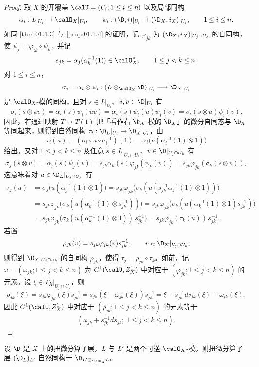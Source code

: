 \begin{proof}
取 $X$ 的开覆盖 $\calU=(U_i;1\le i\le n)$ 以及局部同构
$$\alpha_i:L|_{U_i}\to\calO_X|_{U_i},\qquad \psi_i:(\D,i)|_{U_i}\to(\D_X,i_X)|_{U_i},\qquad 1\le i\le n.$$
如同 \ref{thm:01.1.3} 与 \ref{prop:01.1.4} 的证明，记 $\varphi_{jk}$ 为 $(\D_X,i_X)|_{U_j\cap U_k}$ 的自同构，使 $\psi_j=\varphi_{jk}\circ\psi_k$，并记
$$s_{jk}=\alpha_j(\alpha_k^{-1}(1))\in\calO_X^*,\qquad 1\le j<k\le n.$$
对 $1\le i\le n$，
$$\sigma_i=\alpha_i\otimes\psi_i:(L\otimes_{\calO_X}\D)|_{U_i}\longrightarrow\D_X|_{U_i}$$
是 $\calO_X$-模的同构，且对 $s\in L|_{U_i}$、$u,v\in\D|_{U_i}$ 有
$$\sigma_i(s\otimes uv)=\alpha_i(s)\psi_i(uv)=\alpha_i(s)\psi_i(u)\psi_i(v)=\sigma_i(s\otimes u)\psi_i(v).$$
因此，若通过映射 $T\mapsto T(1)$ 把「看作右 $\D_X$-模的 $\D_X$」的微分自同态与 $\D_X$ 等同起来，则得到自然同构 $\tau_i:\D_L|_{U_i}\to\D_X|_{U_i}$，由
$$\tau_i(u)=(\sigma_i\circ u\circ\sigma_i^{-1})(1)=\sigma_i\bigl(u(\alpha_i^{-1}(1)\otimes 1)\bigr)$$
给出。又对 $1\le j<k\le n$ 及任意 $s\in L|_{U_j\cap U_k}$、$v\in\D|_{U_j\cap U_k}$ 有
$$\sigma_j(s\otimes v)=\alpha_j(s)\psi_j(v)=s_{jk}\alpha_k(s)\varphi_{jk}(\psi_k(v))=s_{jk}\varphi_{jk}(\sigma_k(s\otimes v)),$$
这意味着对 $u\in\D_L|_{U_j\cap U_k}$ 有
\begin{align*}
\tau_j(u)&=\sigma_j\bigl(u(\alpha_j^{-1}(1)\otimes 1)\bigr)=s_{jk}\varphi_{jk}\bigl(\sigma_k(u(s_{jk}^{-1}\alpha_k^{-1}(1)\otimes 1))\bigr)\\
&=s_{jk}\varphi_{jk}\bigl(\sigma_k(u(\alpha_k^{-1}(1)\otimes s_{jk}^{-1}))\bigr)=s_{jk}\varphi_{jk}\bigl(\sigma_k(u(\alpha_k^{-1}(1)\otimes 1)s_{jk}^{-1})\bigr)\\
&=s_{jk}\varphi_{jk}\bigl(\sigma_k(u(\alpha_k^{-1}(1)\otimes 1))\,s_{jk}^{-1}\bigr)=s_{jk}\varphi_{jk}(\tau_k(u))\,s_{jk}^{-1}.
\end{align*}
若置
$$\rho_{jk}(v)=s_{jk}\varphi_{jk}(v)s_{jk}^{-1},\qquad v\in\D_X|_{U_j\cap U_k},$$
则得到 $\D_X|_{U_j\cap U_k}$ 的自同构 $\rho_{jk}$，使得 $\tau_j=\rho_{jk}\circ\tau_k$。如前，记 $\omega=(\omega_{jk};1\le j<k\le n)$ 为 $C^1(\calU,Z^1_X)$ 中对应于 $(\varphi_{jk};1\le j<k\le n)$ 的元素。设 $\xi\in T_X|_{U_j\cap U_k}$，则
$$\rho_{jk}(\xi)=s_{jk}\varphi_{jk}(\xi)s_{jk}^{-1}=s_{jk}(\xi-\omega_{jk}(\xi))s_{jk}^{-1}=\xi-s_{jk}^{-1}ds_{jk}(\xi)-\omega_{jk}(\xi),$$
因此 $C^1(\calU,Z^1_X)$ 中对应于 $(\rho_{jk};1\le j<k\le n)$ 的元素等于
$$(\omega_{jk}+s_{jk}^{-1}ds_{jk};\ 1\le j<k\le n).$$
\end{proof}

\begin{proposition}\label{prop:01.1.9}
设 $\D$ 是 $X$ 上的扭微分算子层，$L$ 与 $L'$ 是两个可逆 $\calO_X$-模。则扭微分算子层 $(\D_L)_{L'}$ 自然同构于 $\D_{L'\otimes_{\calO_X}L}$。
\end{proposition}

